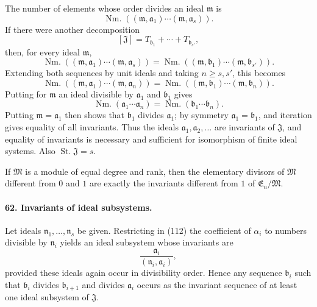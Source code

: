 \documentclass[11pt]{article}
\newcommand{\St}{\operatorname{St.}}
\newcommand{\Nm}{\operatorname{Nm.}}
\begin{document}
The number of elements whose order divides an ideal $\mathfrak m$ is
\[
  \Nm((\mathfrak m,\mathfrak a_1)\cdots(\mathfrak m,\mathfrak a_s)).
\]
If there were another decomposition
\[
  [\mathfrak J]=T_{\mathfrak b_1}+\cdots+T_{\mathfrak b_{s'}},
\]
then, for every ideal $\mathfrak m$,
\begin{equation}
  \Nm((\mathfrak m,\mathfrak a_1)\cdots(\mathfrak m,\mathfrak a_s))
  =
  \Nm((\mathfrak m,\mathfrak b_1)\cdots(\mathfrak m,\mathfrak b_{s'})).
\tag{113}
\end{equation}
Extending both sequences by unit ideals and taking $n\ge s,s'$, this becomes
\begin{equation}
  \Nm((\mathfrak m,\mathfrak a_1)\cdots(\mathfrak m,\mathfrak a_n))
  =
  \Nm((\mathfrak m,\mathfrak b_1)\cdots(\mathfrak m,\mathfrak b_n)).
\tag{114}
\end{equation}
Putting for $\mathfrak m$ an ideal divisible by $\mathfrak a_1$ and $\mathfrak b_1$ gives
\begin{equation}
  \Nm(\mathfrak a_1\cdots\mathfrak a_n)
  =
  \Nm(\mathfrak b_1\cdots\mathfrak b_n).
\tag{115}
\end{equation}
Putting $\mathfrak m=\mathfrak a_1$ then shows that $\mathfrak b_1$ divides $\mathfrak a_1$; by symmetry $\mathfrak a_1=\mathfrak b_1$, and iteration gives equality of all invariants. Thus the ideals $\mathfrak a_1,\mathfrak a_2,
\ldots$ are invariants of $\mathfrak J$, and equality of invariants is necessary and sufficient for isomorphism of finite ideal systems. Also $\St\mathfrak J=s$.

If $\mathfrak M$ is a module of equal degree and rank, then the elementary divisors of $\mathfrak M$ different from $0$ and $1$ are exactly the invariants different from $1$ of $\mathfrak E_n/\mathfrak M$.

\paragraph{62. Invariants of ideal subsystems.}
Let ideals $\mathfrak n_1,
\ldots,
\mathfrak n_s$ be given. Restricting in (112) the coefficient of $\alpha_i$ to numbers divisible by $\mathfrak n_i$ yields an ideal subsystem whose invariants are
\[
  \frac{\mathfrak a_i}{(\mathfrak n_i,\mathfrak a_i)},
\]
provided these ideals again occur in divisibility order. Hence any sequence $\mathfrak b_i$ such that $\mathfrak b_i$ divides $\mathfrak b_{i+1}$ and divides $\mathfrak a_i$ occurs as the invariant sequence of at least one ideal subsystem of $\mathfrak J$.
\end{document}
